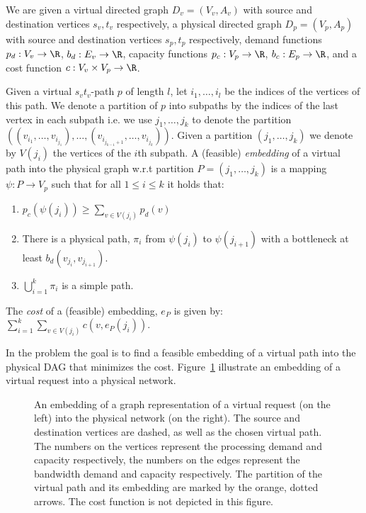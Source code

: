 We are given a virtual directed graph $D_v = (V_v, A_v)$ 
with source and destination vertices $s_v, t_v$ respectively, 
a physical directed graph $D_p = (V_p, A_p)$
with source and destination vertices $s_p, t_p$ respectively,
demand functions $p_d : V_v \to \R$, $b_d : E_v \to \R$,
capacity functions $p_c : V_p \to \R$, $b_c : E_p \to \R$,
and a cost function $c: V_v \times V_p \to \R$. 

Given a virtual $s_vt_v$-path $p$ of length $l$,
let $i_1, \ldots, i_l$ be the indices of the vertices of this path.
We denote a partition of $p$ into subpaths by the indices of the last vertex in
each subpath i.e. we use $j_1, \ldots, j_k$ to denote the partition 
$((v_{i_1}, \ldots, v_{i_{j_1}}), \ldots, (v_{i_{j_{k-1} + 1}}, \ldots,
v_{i_{j_k}}))$.
Given a partition $(j_1, \ldots, j_k)$ we denote by $V(j_i)$ the vertices of the
$i$th subpath.
A (feasible) \emph{embedding} of a virtual path into the physical graph 
w.r.t partition $P = (j_1, \ldots,j_k)$ is a mapping $\psi : P \to V_p$ such that
for all $1 \leq i \leq k$ it holds that:
\begin{enumerate}
  \item $p_c(\psi(j_i)) \geq \sum_{v \in V(j_i)} p_d(v)$
  \item There is a physical path, $\pi_i$ from $\psi(j_i)$ to $\psi(j_{i+1})$ with a
  bottleneck at least $b_d(v_{j_i}, v_{j_{i+1}})$.
  \item $\bigcup_{i = 1}^k \pi_i$ is a simple path.
\end{enumerate}
The \emph{cost} of a (feasible) embedding, $e_P$ is given by:
$\sum_{i = 1}^k \sum_{v \in V(j_i)} c(v, e_P(j_i))$.   

In the \VPN problem the goal is to find a
feasible embedding of a virtual path into the physical DAG that minimizes the
cost.
Figure~\ref{fig:problem} illustrate an embedding of a virtual request into a
physical network. 

\begin{figure}[ht]
\centering
\scalebox{.8}{

}
\caption{
An embedding of a graph representation of a virtual request (on the left) into
the physical network (on the right).
The source and destination vertices are dashed, as well as the chosen virtual
path.
The numbers on the vertices represent the processing demand and capacity
respectively, 
the numbers on the edges represent the bandwidth demand and capacity
respectively.
The partition of the virtual path and its embedding are marked by the orange,
dotted arrows.
The cost function is not depicted in this figure.
\label{fig:problem}
}
\end{figure}
